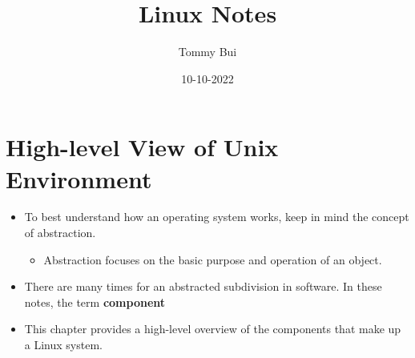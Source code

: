 \documentclass{article}
\title{Linux Notes}
\date{10-10-2022}
\author{Tommy Bui}
\begin{document}
	\maketitle
	\newpage
	
	\section{High-level View of Unix Environment}
	\begin{itemize}
		\item To best understand how an operating system works, keep in mind the concept of abstraction.
		\begin{itemize}
			\item Abstraction focuses on the basic purpose and operation of an object.
		\end{itemize}
		\item There are many times for an abstracted subdivision in software. In these notes, the term {\bf component} 
		\item This chapter provides a high-level overview of the components that make up a Linux system.
	\end{itemize}
\end{document}

